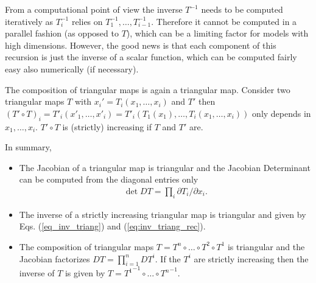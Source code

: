 \documentclass[12pt,a4paper]{article}
\begin{document}
From a computational point of view the inverse $T^{-1}$ needs to be computed iteratively as $T^{-1}_i$ relies on $T^{-1}_{1}, \dots, T^{-1}_{i-1}$. Therefore it cannot be computed in a parallel fashion (as opposed to $T$), which can be a limiting factor for models with high dimensions. However, the good news is that each component of this recursion is just the inverse of a scalar function, which can be computed fairly easy also numerically (if necessary).


The composition of triangular maps is again a triangular map. Consider two triangular maps $T$ with $x_i' = T_i(x_1, \dots, x_i)$ and $T'$ then $(T'\circ T)_i = T'_i(x'_1, \dots, x'_i) = T'_i(T_1(x_1), \dots, T_i(x_1, \dots, x_i))$ only depends in $x_1, \dots, x_i$. $T'\circ T$ is (strictly) increasing if $T$ and $T'$ are.

In summary,
\begin{itemize}
	\item The Jacobian of a triangular map is triangular and the Jacobian Determinant can be computed from the diagonal entries only
	\begin{align} \label{eq:jac_triangular}
		\det DT = \prod_i \partial T_i /\partial x_i.
	\end{align} 
	\item The inverse of  a strictly increasing triangular map is triangular and given by Eqs. (\ref{eq_inv_triang}) and (\ref{eq:inv_triang_rec}).
	\item The composition of triangular maps $T = T^n \circ \dots \circ T^2 \circ T^1 $ is triangular and the Jacobian  factorizes $DT = \prod_{i=1}^{n} DT^i $. If the $T^i$ are strictly increasing then the inverse of $T$  is given by $T = {T^{1}}^{-1} \circ \dots  \circ {T^{n}}^{-1}$. 
\end{itemize}
\end{document}
